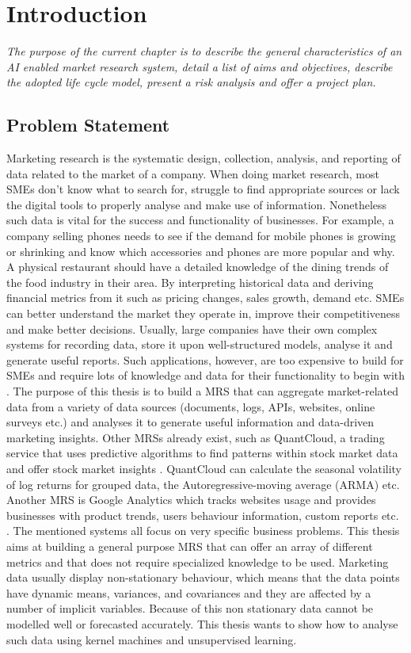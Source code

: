 \chapter{Introduction}

\textsl{The purpose of the current chapter is to describe the general characteristics of an AI enabled market research system, detail a list of aims and objectives, describe the adopted life cycle model, present a risk analysis and offer a project plan.}

\section{Problem Statement}
Marketing research is the systematic design, collection, analysis, and reporting of data related to the market of a company. When doing market research, most \ac{SME}s don’t know what to search for, struggle to find appropriate sources or lack the digital tools to properly analyse and make use of information. Nonetheless such data is vital for the success and functionality of businesses. For example, a company selling phones needs to see if the demand for mobile phones is growing or shrinking and know which accessories and phones are more popular and why. A physical restaurant should have a detailed knowledge of the dining trends of the food industry in their area. By interpreting historical data and deriving financial metrics from it such as pricing changes, sales growth, demand etc. \ac{SME}s can better understand the market they operate in, improve their competitiveness and make better decisions. Usually, large companies have their own complex systems for recording data, store it upon well-structured models, analyse it and generate useful reports. Such applications, however, are too expensive to build for \ac{SME}s and require lots of knowledge and data for their functionality to begin with \cite{digitaltrasformationsmes}. The purpose of this thesis is to build a \ac{MRS} that can aggregate market-related data from a variety of data sources (documents, logs, APIs, websites, online surveys etc.) and analyses it to generate useful information and data-driven marketing insights. Other \ac{MRS}s already exist, such as QuantCloud, a trading service that uses predictive algorithms to find patterns within stock market data and offer stock market insights \cite{quantcloud}. QuantCloud can calculate the seasonal volatility of log returns for grouped data, the Autoregressive-moving average (ARMA) etc. Another \ac{MRS} is Google Analytics which tracks websites usage and provides businesses with product trends, users behaviour information, custom reports etc. \cite{googleanalytics}. The mentioned systems all focus on very specific business problems. This thesis aims at building a general purpose \ac{MRS} that can offer an array of different metrics and that does not require specialized knowledge to be used. Marketing data usually display non-stationary behaviour, which means that the data points have dynamic means, variances, and covariances and they are affected by a number of implicit variables. Because of this non stationary data cannot be modelled well or forecasted accurately. This thesis wants to show how to analyse such data using kernel machines and unsupervised learning.

